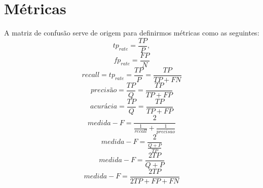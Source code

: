 \chapter{Métricas}\label{cap_metricas}

A matriz de confusão serve de origem para definirmos métricas como as seguintes:
\begin{equation}\label{cap_fusao_eq_01}
	tp_{rate}=\frac{TP}{P},
\end{equation}
\begin{equation}\label{cap_fusao_eq_02}
	fp_{rate}=\frac{FP}{N}
\end{equation}
\begin{equation}\label{cap_fusao_eq_02}
recall= tp_{rate}=\frac{TP}{P}=\frac{TP}{TP+FN}
\end{equation}
\begin{equation}\label{cap_fusao_eq_02}
precisão = \frac{TP}{Q}=\frac{TP}{TP+FP} 
\end{equation}
\begin{equation}\label{cap_fusao_eq_02}
acurácia = \frac{TP}{Q}=\frac{TP}{TP+FP} 
\end{equation}
\begin{equation}\nonumber
medida-F=\frac{2}{\frac{1}{recall}+\frac{1}{precisao}}
\end{equation}
\begin{equation}\nonumber
	medida-F=\frac{2}{\frac{Q+P}{TP}}
\end{equation}
\begin{equation}\nonumber
	medida-F=\frac{2TP}{Q+P}
\end{equation}
\begin{equation}\nonumber
	medida-F=\frac{2TP}{2TP+FP+FN}
\end{equation}

